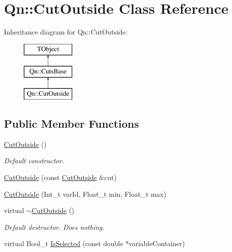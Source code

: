 \hypertarget{classQn_1_1CutOutside}{}\section{Qn\+:\+:Cut\+Outside Class Reference}
\label{classQn_1_1CutOutside}
Inheritance diagram for Qn\+:\+:Cut\+Outside\+:\begin{figure}[H]
\begin{center}
\leavevmode
\includegraphics[height=3.000000cm]{classQn_1_1CutOutside}
\end{center}
\end{figure}
\subsection*{Public Member Functions}
\begin{DoxyCompactItemize}
\item 
\mbox{\label{classQn_1_1CutOutside_a6667534ec2b340af943b150a642325c4}} 
\mbox{\hyperlink{classQn_1_1CutOutside_a6667534ec2b340af943b150a642325c4}{Cut\+Outside}} ()
\begin{DoxyCompactList}\small\item\em Default constructor. \end{DoxyCompactList}\item 
\mbox{\hyperlink{classQn_1_1CutOutside_a58878430ec8e3cdf04bbf01551915c34}{Cut\+Outside}} (const \mbox{\hyperlink{classQn_1_1CutOutside}{Cut\+Outside}} \&cut)
\item 
\mbox{\hyperlink{classQn_1_1CutOutside_a1e47a825aaff83255e48dd4ee159ab54}{Cut\+Outside}} (Int\+\_\+t var\+Id, Float\+\_\+t min, Float\+\_\+t max)
\item 
\mbox{\label{classQn_1_1CutOutside_a0feafa5d0b1a6ecd09629a53aef56c52}} 
virtual \mbox{\hyperlink{classQn_1_1CutOutside_a0feafa5d0b1a6ecd09629a53aef56c52}{$\sim$\+Cut\+Outside}} ()
\begin{DoxyCompactList}\small\item\em Default destructor. Does nothing. \end{DoxyCompactList}\item 
virtual Bool\+\_\+t \mbox{\hyperlink{classQn_1_1CutOutside_ad368fe06c6b6228edbef319e73f63e24}{Is\+Selected}} (const double $\ast$variable\+Container)
\end{DoxyCompactItemize}

